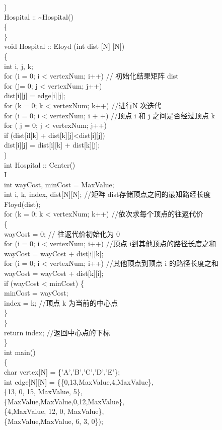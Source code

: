 \documentclass[10pt]{article}
\begin{document}
)\\
Hospital :: \~{}Hospital()\\
\{\\
\}\\[0pt]
void Hospital :: Eloyd (int dist [N] [N])\\
\{\\
int i, j, k;\\
for (i = 0; i < vertexNum; i++) // 初始化结果矩阵 dist\\
for (j= 0; j < vertexNum; j++)\\[0pt]
dist[i][j] = edge[i][j];\\
for (k = 0; k < vertexNum; k++) //进行N 次迭代\\
for (i = 0; i < vertexNum; i + +) //顶点 i 和 j 之间是否经过顶点 k\\
for ( j = 0; j < vertexNum; j++)\\[0pt]
if (dist[il[k] + dist[k][j]<dist[i][j])\\[0pt]
dist[i][j] = dist[i][k] + dist[k][j];\\
)\\
int Hospital :: Center()\\
I\\
int wayCost, minCost = MaxValue;\\[0pt]
int i, k, index, dist[N][N]; //矩哖 dist存储顶点之间的最知路经长度\\
Floyd(dist);\\
for (k = 0; k < vertexNum; k++) //依次求每个顶点的往返代价\\
\{\\
wayCost = 0; // 往返代价初始化为 0\\
for (i = 0; i < vertexNum; i++) //顶点 i到其他顶点的路径长度之和\\[0pt]
wayCost = wayCost + dist[i][k];\\
for (i = 0; i < vertexNum; i++) //其他顶点到顶点 i 的路径长度之和\\[0pt]
wayCost = wayCost + dist[k][i];\\
if (wayCost < minCost) \{\\
minCost = wayCost;\\
index = k; //顶点 k 为当前的中心点\\
\}\\
\}\\
return index; //返回中心点的下标\\
\}\\
int main()\\
\{\\[0pt]
char vertex[N] = \{'A','B','C','D','E'\};\\[0pt]
int edge[N][N] = \{\{0,13,MaxValue,4,MaxValue\},\\
\{13, 0, 15, MaxValue, 5\},\\
\{MaxValue,MaxValue,0,12,MaxValue\},\\
\{4,MaxValue, 12, 0, MaxValue\},\\
\{MaxValue,MaxValue, 6, 3, 0\});
\end{document}
